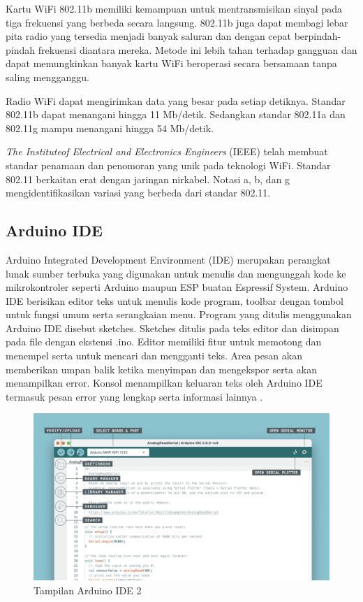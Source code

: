 Kartu WiFi 802.11b memiliki kemampuan untuk mentransmisikan sinyal pada tiga frekuensi yang berbeda secara langsung. 802.11b juga dapat membagi lebar pita radio yang tersedia menjadi banyak saluran dan dengan cepat berpindah-pindah frekuensi diantara mereka. Metode ini lebih tahan terhadap gangguan dan dapat memungkinkan banyak kartu WiFi beroperasi secara bersamaan tanpa saling mengganggu.

Radio WiFi dapat mengirimkan data yang besar pada setiap detiknya. Standar 802.11b dapat menangani hingga 11 Mb/detik. Sedangkan standar 802.11a dan 802.11g mampu menangani hingga 54 Mb/detik.

\emph{The Instituteof Electrical and Electronics Engineers} (IEEE) telah membuat standar penamaan dan penomoran yang unik pada teknologi WiFi. Standar 802.11 berkaitan erat dengan jaringan nirkabel. Notasi a, b, dan g mengidentifikasikan variasi yang berbeda dari standar 802.11. 

\subsection{Arduino IDE}

Arduino Integrated Development Environment (IDE) merupakan perangkat lunak sumber terbuka yang digunakan untuk menulis dan mengunggah kode ke mikrokontroler seperti Arduino maupun ESP buatan Espressif System. Arduino IDE berisikan editor teks untuk menulis kode program, toolbar dengan tombol untuk fungsi umum serta serangkaian menu. Program yang ditulis menggunakan Arduino IDE disebut sketches. Sketches ditulis 
pada teks editor dan disimpan pada file dengan ekstensi .ino. Editor memiliki fitur untuk memotong dan menempel serta untuk mencari dan mengganti teks. Area pesan akan memberikan umpan balik ketika menyimpan dan mengekspor serta akan menampilkan error. Konsol menampilkan keluaran teks oleh Arduino IDE termasuk pesan error yang lengkap serta informasi lainnya \parencite{Söderby_Hylén_2023a}.

\begin{figure} [ht] \centering
    \includegraphics[scale=0.235]{gambar/arduinoIDEoverview.png}
    \caption{Tampilan Arduino IDE 2}
    \label{fig:ArduinoIDEOverview}
\end{figure}

